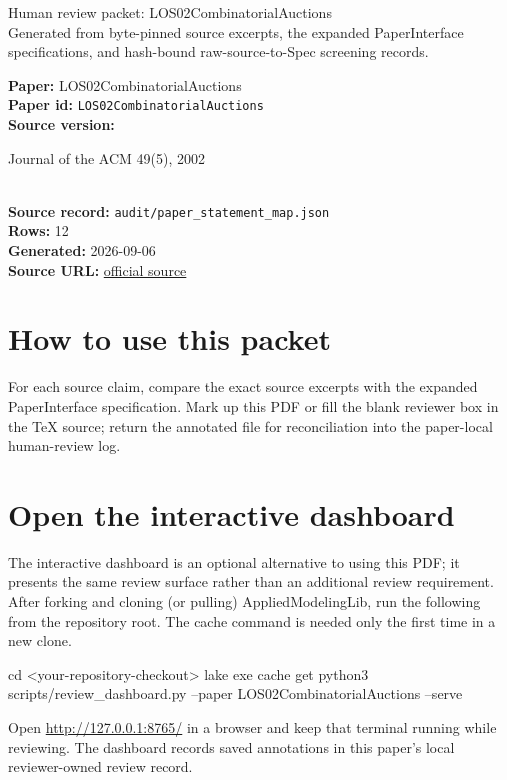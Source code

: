 \documentclass[10pt]{article}
\begin{document}
\fontsize{9}{10}\selectfont

\begin{center}
{\LARGE Human review packet: LOS02CombinatorialAuctions}\\[0.35em]
\small Generated from byte-pinned source excerpts, the expanded PaperInterface
specifications, and hash-bound raw-source-to-Spec screening records.
\end{center}

\noindent\textbf{Paper:} LOS02CombinatorialAuctions\\
\textbf{Paper id:} \texttt{LOS02CombinatorialAuctions}\\
\textbf{Source version:} \parbox[t]{0.76\linewidth}{\raggedright Journal of the ACM 49(5), 2002}\\
\textbf{Source record:} \texttt{audit/paper\_statement\_map.json}\\
\textbf{Rows:} 12\\
\textbf{Generated:} 2026-09-06\\
\textbf{Source URL:} \href{https://arxiv.org/pdf/cs/0202017v1}{official source}





\section*{How to use this packet}
For each source claim, compare the exact source excerpts with the expanded
PaperInterface specification. Mark up this PDF or fill the blank reviewer box in the TeX source;
return the annotated file for reconciliation into the paper-local human-review
log.

\section*{Open the interactive dashboard}
The interactive dashboard is an optional alternative to using this PDF; it
presents the same review surface rather than an additional review requirement.
After forking and cloning (or pulling) AppliedModelingLib, run the following from the
repository root. The cache command is needed only the first time in a new clone.
\begin{ReviewVerbatim}
cd <your-repository-checkout>
lake exe cache get
python3 scripts/review_dashboard.py --paper LOS02CombinatorialAuctions --serve
\end{ReviewVerbatim}
Open \url{http://127.0.0.1:8765/} in a browser and keep that terminal running
while reviewing. The dashboard records saved annotations in this paper's local
reviewer-owned review record.
\end{document}
